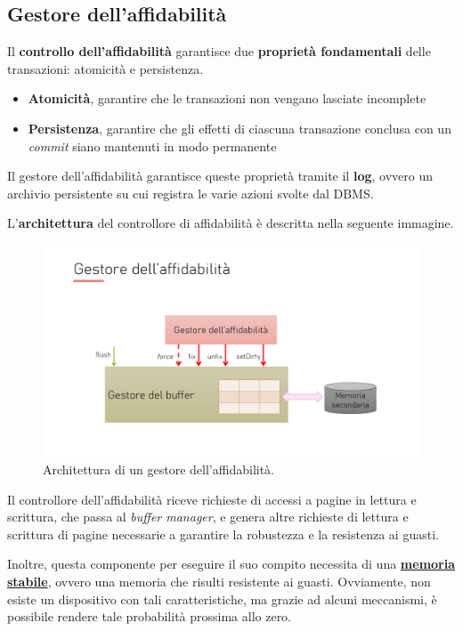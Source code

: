 \documentclass[a4paper]{article}
\begin{document}
	\subsection{Gestore dell'affidabilità}
	
	Il \textcolor{Red3}{\textbf{controllo dell'affidabilità}} garantisce due \textbf{proprietà fondamentali} delle transazioni: atomicità e persistenza.
	\begin{itemize}
		\item \textbf{Atomicità}, garantire che le transazioni non vengano lasciate incomplete
		\item \textbf{Persistenza}, garantire che gli effetti di ciascuna transazione conclusa con un \emph{commit} siano mantenuti in modo permanente
	\end{itemize}
	Il gestore dell'affidabilità garantisce queste proprietà tramite il \textbf{log}, ovvero un archivio persistente su cui registra le varie azioni svolte dal DBMS.\newline
	
	\noindent
	L'\textbf{architettura} del controllore di affidabilità è descritta nella seguente immagine.
	\begin{figure}[!htp]
		\centering
		\includegraphics[width=\textwidth]{img/architettura_gestore_affidabilita.pdf}
		\caption{Architettura di un gestore dell'affidabilità.}
	\end{figure}
	
	\noindent
	Il controllore dell'affidabilità riceve richieste di accessi a pagine in lettura e scrittura, che passa al \emph{buffer manager}, e genera altre richieste di lettura e scrittura di pagine necessarie a garantire la robustezza e la resistenza ai guasti.\newline
	
	\noindent
	Inoltre, questa componente per eseguire il suo compito necessita di una \textbf{\underline{memoria}} \textbf{\underline{stabile}}, ovvero una memoria che risulti resistente ai guasti. Ovviamente, non esiste un dispositivo con tali caratteristiche, ma grazie ad alcuni meccanismi, è possibile rendere tale probabilità prossima allo zero.\newpage
	
\end{document}
